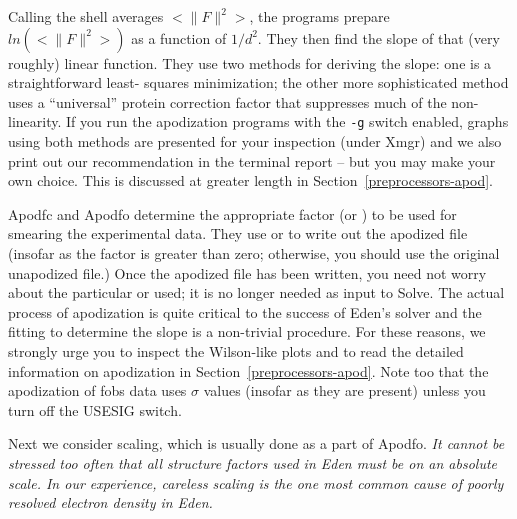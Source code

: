 \documentclass{report}
\begin{document}
Calling the shell averages $<\|F\|^2>$, the programs prepare $ln(<\|F\|^2>)$ 
as a function of $1/d^2$.
They then find the slope of that (very roughly) linear function.
They use two methods for deriving the slope: one is a straightforward least-
squares minimization; the other more sophisticated method uses a ``universal'' 
protein correction factor \cite{cowtan} 
that suppresses much of the non-linearity.
If you run the apodization programs with the {\tt -g} switch enabled, graphs 
using both methods are presented for your inspection (under Xmgr) and 
we also print out our recommendation in the terminal report -- but you may make
your own choice.  This is discussed at greater length in 
Section~\ref{preprocessors-apod}.

Apodfc and Apodfo determine the appropriate factor 
(\delfo or \delfc) to be used for smearing the experimental data. 
They use \delfo or \delfc to write out the apodized file (insofar as the
factor is greater than zero; otherwise, you should use the
original unapodized file.)
Once the apodized file has been written, you need not worry about the
particular \delfo or \delfc used; it is no longer needed as input to Solve.
The actual process of apodization is quite critical to the success of Eden's
solver and the fitting to determine the slope is a non-trivial procedure.  
For these reasons, we strongly urge you to inspect the Wilson-like plots 
and to read the detailed information on apodization in 
Section~\ref{preprocessors-apod}.  Note too that the apodization 
of fobs data uses $\sigma$ values (insofar as they are present) unless you
turn off the USESIG switch.  

\vspace {0.1in}

Next we consider scaling, which is usually done as a part of Apodfo.
{\em It cannot be stressed too often that all structure factors used 
in Eden must be on an absolute scale.
In our experience, careless scaling is the one most common cause of poorly 
resolved electron density in Eden.}

\vspace {0.1in}
\end{document}
